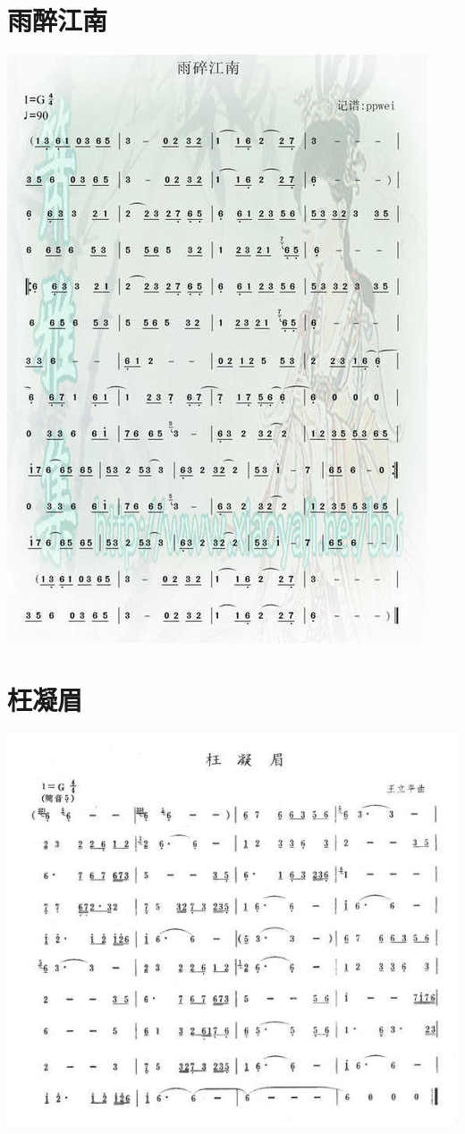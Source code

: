 \documentclass[cn,pad,chinese,chinesefont=nofont]{elegantbook}
\begin{document}
\section{雨醉江南}
    \includegraphics[width=\textwidth]{dongxiao/雨醉江南.jpg}
\section{枉凝眉}
    \includegraphics[width=\textwidth]{dongxiao/枉凝眉.jpg}
\end{document}
